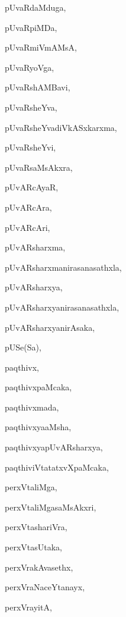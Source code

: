\begin{multicols}{2}
{pUvaRdaMduga}, \pageref{pUvaRdaMduga}

{pUvaRpiMDa}, \pageref{pUvaRpiMDa}

{pUvaRmiVmAMsA}, \pageref{pUvaRmiVmAMsA}

{pUvaRyoVga}, \pageref{pUvaRyoVga}

{pUvaRshAMBavi}, \pageref{pUvaRshAMBavi}

{pUvaRsheYva}, \pageref{pUvaRsheYva}

{pUvaRsheYvadiVkASxkarxma}, \pageref{pUvaRsheYvadiVkASxkarxma}

{pUvaRsheYvi}, \pageref{pUvaRsheYvi}

{pUvaRsaMsAkxra}, \pageref{pUvaRsaMsAkxra}

{pUvARcAyaR}, \pageref{pUvARcAyaR}

{pUvARcAra}, \pageref{pUvARcAra}

{pUvARcAri}, \pageref{pUvARcAri}

{pUvARsharxma}, \pageref{pUvARsharxma}

{pUvARsharxmanirasanasathxla}, \pageref{pUvARsharxmanirasanasathxla}

{pUvARsharxya}, \pageref{pUvARsharxya}

{pUvARsharxyanirasanasathxla}, \pageref{pUvARsharxyanirasanasathxla}

{pUvARsharxyanirAsaka}, \pageref{pUvARsharxyanirAsaka}

{pUSe(Sa)}, \pageref{pUSeSa}

{paqthivx}, \pageref{paqthivx}

{paqthivxpaMcaka}, \pageref{paqthivxpaMcaka}

{paqthivxmada}, \pageref{paqthivxmada}

{paqthivxyaaMsha}, \pageref{paqthivxyaaMsha}

{paqthivxyapUvARsharxya}, \pageref{paqthivxyapUvARsharxya}

{paqthiviVtatatxvXpaMcaka}, \pageref{paqthiviVtatatxvXpaMcaka}

{perxVtaliMga}, \pageref{perxVtaliMga}

{perxVtaliMgasaMsAkxri}, \pageref{perxVtaliMgasaMsAkxri}

{perxVtashariVra}, \pageref{perxVtashariVra}

{perxVtasUtaka}, \pageref{perxVtasUtaka}

{perxVrakAvasethx}, \pageref{perxVrakAvasethx}

{perxVraNaceYtanayx}, \pageref{perxVraNaceYtanayx}

{perxVrayitA}, \pageref{perxVrayitA}


\end{multicols}
